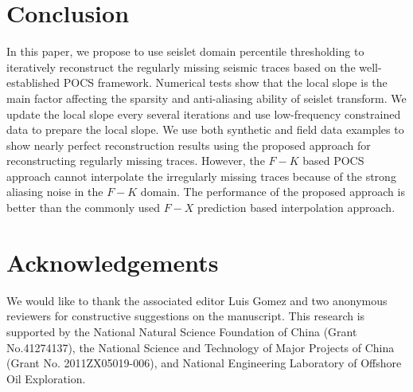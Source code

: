 \section{Conclusion}
In this paper, we propose to use seislet domain percentile thresholding to iteratively reconstruct the regularly missing seismic traces based on the well-established POCS framework. Numerical tests show that the local slope is the main factor affecting the sparsity and anti-aliasing ability of seislet transform. %
We update the local slope every several iterations and use low-frequency constrained data to prepare the local slope. We use both synthetic and field data examples to show nearly perfect reconstruction results using the proposed approach for reconstructing regularly missing traces. However, the $F-K$ based POCS approach cannot interpolate the irregularly missing traces because of the strong aliasing noise in the $F-K$ domain. The performance of the proposed approach is better than the commonly used $F-X$ prediction based interpolation approach. 
 
\section{Acknowledgements}
We would like to thank the associated editor Luis Gomez and two anonymous reviewers for constructive suggestions on the manuscript. This research is supported by the National Natural Science Foundation of China (Grant No.41274137), the National Science and Technology of Major Projects of China (Grant No. 2011ZX05019-006), and National Engineering Laboratory of Offshore Oil Exploration.




